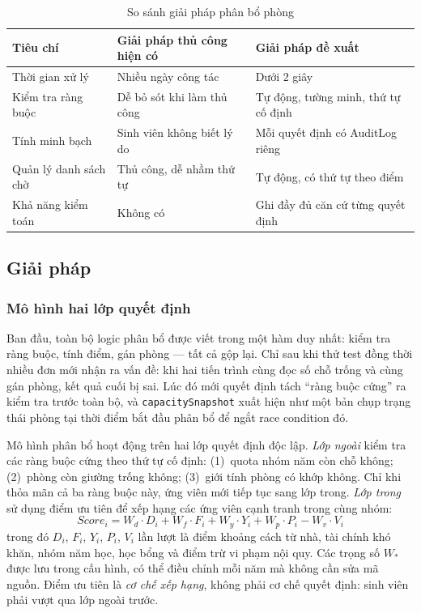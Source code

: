 \documentclass[../DoAn.tex]{subfiles}
\begin{document}
\begin{table}[H]
\centering
\caption{So sánh giải pháp phân bổ phòng}
\label{tab:alloc_comparison}
\small
\begin{tabular}{|p{3.5cm}|p{4.5cm}|p{4.8cm}|}
\hline
\textbf{Tiêu chí} & \textbf{Giải pháp thủ công hiện có} & \textbf{Giải pháp đề xuất} \\
\hline
Thời gian xử lý & Nhiều ngày công tác & Dưới 2 giây \\
\hline
Kiểm tra ràng buộc & Dễ bỏ sót khi làm thủ công & Tự động, tường minh, thứ tự cố định \\
\hline
Tính minh bạch & Sinh viên không biết lý do & Mỗi quyết định có AuditLog riêng \\
\hline
Quản lý danh sách chờ & Thủ công, dễ nhầm thứ tự & Tự động, có thứ tự theo điểm \\
\hline
Khả năng kiểm toán & Không có & Ghi đầy đủ căn cứ từng quyết định \\
\hline
\end{tabular}
\end{table}

\subsection{Giải pháp}
\label{subsec:alloc_model}

\subsubsection{Mô hình hai lớp quyết định}

Ban đầu, toàn bộ logic phân bổ được viết trong một hàm duy nhất: kiểm tra
ràng buộc, tính điểm, gán phòng --- tất cả gộp lại. Chỉ sau khi thử test đồng
thời nhiều đơn mới nhận ra vấn đề: khi hai tiến trình cùng đọc số chỗ trống
và cùng gán phòng, kết quả cuối bị sai. Lúc đó mới quyết định tách ``ràng buộc
cứng'' ra kiểm tra trước toàn bộ, và \texttt{capacitySnapshot} xuất hiện như
một bản chụp trạng thái phòng tại thời điểm bắt đầu phân bổ để ngắt race
condition đó.

Mô hình phân bổ hoạt động trên hai lớp quyết định độc lập. \textit{Lớp ngoài}
kiểm tra các ràng buộc cứng theo thứ tự cố định: (1)~quota nhóm năm còn chỗ
không; (2)~phòng còn giường trống không; (3)~giới tính phòng có khớp không.
Chỉ khi thỏa mãn cả ba ràng buộc này, ứng viên mới tiếp tục sang lớp trong.
\textit{Lớp trong} sử dụng điểm ưu tiên để xếp hạng các ứng viên cạnh tranh
trong cùng nhóm:
\begin{equation}
Score_i = W_d \cdot D_i + W_f \cdot F_i + W_y \cdot Y_i + W_p \cdot P_i - W_v \cdot V_i
\label{eq:priority_score}
\end{equation}
trong đó $D_i$, $F_i$, $Y_i$, $P_i$, $V_i$ lần lượt là điểm khoảng cách từ
nhà, tài chính khó khăn, nhóm năm học, học bổng và điểm trừ vi phạm nội quy.
Các trọng số $W_\ast$ được lưu trong cấu hình, có thể điều chỉnh mỗi năm mà
không cần sửa mã nguồn. Điểm ưu tiên là \textit{cơ chế xếp hạng}, không phải
cơ chế quyết định: sinh viên phải vượt qua lớp ngoài trước.
\end{document}
